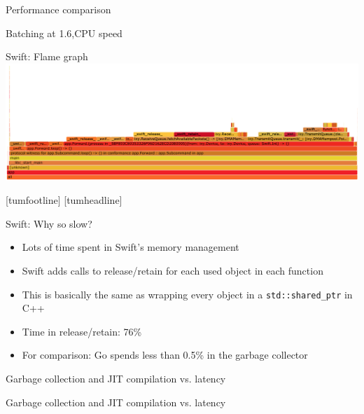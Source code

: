 \documentclass[NET,english,aspectratio=169,notitleframe]{tumbeamer}
\begin{document}
\begin{frame}{Performance comparison}
\centering
\end{frame}

\begin{frame}{Batching at 1.6,\GHz CPU speed}
\centering
\end{frame}

\begin{frame}{Swift: Flame graph}
\hspace{-.5cm}\includegraphics[width=1.065\textwidth]{pics/flamegraph}
\end{frame}
[tumfootline]
[tumheadline]

\begin{frame}{Swift: Why so slow?}
\begin{itemize}
\item Lots of time spent in Swift's memory management
\item Swift adds calls to release/retain for each used object in each function
\item This is basically the same as wrapping every object in a \texttt{std::shared\_ptr} in C++
\vspace{1em}
\pause
\item Time in release/retain: 76\%
\item For comparison: Go spends less than 0.5\% in the garbage collector
\end{itemize}
\end{frame}

\begin{frame}{Garbage collection and JIT compilation vs. latency}
\centering
\end{frame}

\begin{frame}{Garbage collection and JIT compilation vs. latency}
\centering
\end{frame}
\end{document}
